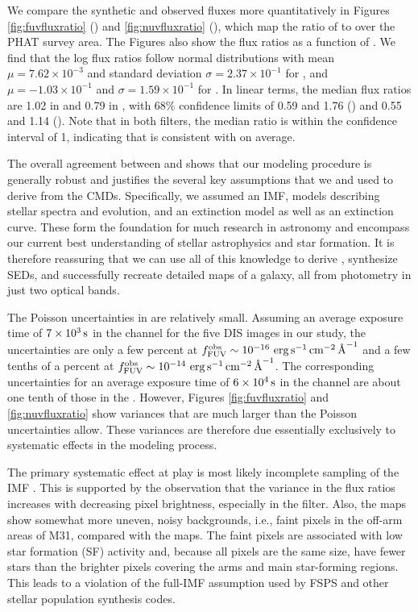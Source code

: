 \documentclass[iop, tighten]{emulateapj}
\begin{document}
We compare the synthetic and observed fluxes more quantitatively in Figures
\ref{fig:fuvfluxratio} (\fuv{}) and \ref{fig:nuvfluxratio} (\nuv{}), which map
the ratio of \fxsfh{} to \fxobs{} over the PHAT survey area. The Figures also
show the flux ratios as a function of \fxobs{}. We find that the log flux
ratios follow normal distributions with mean $\mu = 7.62\times 10^{-3}$ and
standard deviation $\sigma = 2.37\times 10^{-1}$ for \fuv{}, and $\mu =
-1.03\times 10^{-1}$ and $\sigma = 1.59\times 10^{-1}$ for \nuv{}. In linear
terms, the median flux ratios are 1.02 in \fuv{} and 0.79 in \nuv{}, with 68\%
confidence limits of 0.59 and 1.76 (\fuv{}) and 0.55 and 1.14 (\nuv{}). Note
that in both filters, the median ratio is within the confidence interval of 1,
indicating that \fxsfh{} is consistent with \fxobs{} on average.

\figfuvfluxratio

\fignuvfluxratio

The overall agreement between \fxsfh{} and \fxobs{} shows that our modeling
procedure is generally robust and justifies the several key assumptions that we
and \citet{Lewis:2014} used to derive \fxsfh{} from the CMDs. Specifically, we
assumed an IMF, models describing stellar spectra and evolution, and an
extinction model as well as an extinction curve. These form the foundation for
much research in astronomy and encompass our current best understanding of
stellar astrophysics and star formation. It is therefore reassuring that we can
use all of this knowledge to derive , synthesize SEDs, and successfully
recreate detailed maps of a galaxy, all from photometry in just two optical
bands.

The Poisson uncertainties in \fxobs{} are relatively small. Assuming an average
exposure time of $7\times 10^3\,\mathrm{s}$ in the \fuv{} channel for the five DIS
images in our study, the uncertainties are only a few percent at $f_{\mathrm{FUV}}^{\mathrm{obs}} \sim
10^{-16}\, \,\mathrm{erg}\,\mathrm{s}^{-1}\,\mathrm{cm}^{-2}\,\textrm{\AA}^{-1}$ and a few tenths of a percent at $f_{\mathrm{FUV}}^{\mathrm{obs}} \sim
10^{-14}\, \,\mathrm{erg}\,\mathrm{s}^{-1}\,\mathrm{cm}^{-2}\,\textrm{\AA}^{-1}$. The corresponding \nuv{} uncertainties for an average
exposure time of $6\times 10^4\,\mathrm{s}$ in the \nuv{} channel are about one tenth
of those in the \fuv{}. However, Figures \ref{fig:fuvfluxratio} and
\ref{fig:nuvfluxratio} show variances that are much larger than the Poisson
uncertainties allow. These variances are therefore due essentially exclusively
to systematic effects in the modeling process.

The primary systematic effect at play is most likely incomplete sampling of the
IMF \citep{Elmegreen:1999, Bastian:2010, Fumagalli:2011, daSilva:2012,
daSilva:2014}. This is supported by the observation that the variance in the
flux ratios increases with decreasing pixel brightness, especially in the
\fuv{} filter. Also, the \fxsfh{} maps show somewhat more uneven, noisy
backgrounds, i.e., faint pixels in the off-arm areas of M31, compared with the
\fxobs{} maps. The faint pixels are associated with low star formation (SF)
activity and, because all pixels are the same size, have fewer stars than the
brighter pixels covering the arms and main star-forming regions. This leads to
a violation of the full-IMF assumption used by FSPS and other stellar
population synthesis codes.
\end{document}
